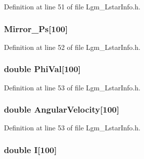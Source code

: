 Definition at line 51 of file Lgm\_\-LstarInfo.h.\hypertarget{struct_lgm___lstar_info_3b9e030b6e119c8e96b971ff682288c9}{
\subsubsection[{Mirror\_\-Ps}]{ {\bf Mirror\_\-Ps}\mbox{[}100\mbox{]}}}
\label{struct_lgm___lstar_info_3b9e030b6e119c8e96b971ff682288c9}




Definition at line 52 of file Lgm\_\-LstarInfo.h.\hypertarget{struct_lgm___lstar_info_04ec246114a405539c0accd9be478347}{
\subsubsection[{PhiVal}]{\setlength{\rightskip}{0pt plus 5cm}double {\bf PhiVal}\mbox{[}100\mbox{]}}}
\label{struct_lgm___lstar_info_04ec246114a405539c0accd9be478347}




Definition at line 53 of file Lgm\_\-LstarInfo.h.\hypertarget{struct_lgm___lstar_info_d76bd4e5f331d6a1ddcaa1639fd68496}{
\subsubsection[{AngularVelocity}]{\setlength{\rightskip}{0pt plus 5cm}double {\bf AngularVelocity}\mbox{[}100\mbox{]}}}
\label{struct_lgm___lstar_info_d76bd4e5f331d6a1ddcaa1639fd68496}




Definition at line 53 of file Lgm\_\-LstarInfo.h.\hypertarget{struct_lgm___lstar_info_41ab61f1b0e2b2ebe5247fbbbdd57b0b}{
\subsubsection[{I}]{\setlength{\rightskip}{0pt plus 5cm}double {\bf I}\mbox{[}100\mbox{]}}}
\label{struct_lgm___lstar_info_41ab61f1b0e2b2ebe5247fbbbdd57b0b}




